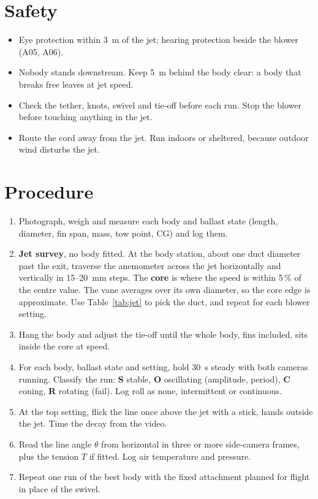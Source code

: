 \documentclass[final]{dbfdoc}
\begin{document}
\section{Safety}
\begin{itemize}
\item Eye protection within 3~m of the jet; hearing protection beside the blower (A05, A06).
\item Nobody stands downstream. Keep 5~m behind the body clear: a body that breaks free leaves at jet speed.
\item Check the tether, knots, swivel and tie-off before each run. Stop the blower before touching anything in the jet.
\item Route the cord away from the jet. Run indoors or sheltered, because outdoor wind disturbs the jet.
\end{itemize}

\section{Procedure}
\begin{enumerate}
\item Photograph, weigh and measure each body and ballast state (length, diameter, fin span, mass, tow point, CG) and log them.
\item \textbf{Jet survey}, no body fitted. At the body station, about one duct diameter past the exit, traverse the anemometer across the jet horizontally and vertically in 15--20~mm steps. The \textbf{core} is where the speed is within 5\,\% of the centre value. The vane averages over its own diameter, so the core edge is approximate. Use Table~\ref{tab:jet} to pick the duct, and repeat for each blower setting.
\item Hang the body and adjust the tie-off until the whole body, fins included, sits inside the core at speed.
\item For each body, ballast state and setting, hold 30~s steady with both cameras running. Classify the run: \textbf{S} stable, \textbf{O} oscillating (amplitude, period), \textbf{C} coning, \textbf{R} rotating (fail). Log roll as none, intermittent or continuous.
\item At the top setting, flick the line once above the jet with a stick, hands outside the jet. Time the decay from the video.
\item Read the line angle $\theta$ from horizontal in three or more side-camera frames, plus the tension $T$ if fitted. Log air temperature and pressure.
\item Repeat one run of the best body with the fixed attachment planned for flight in place of the swivel.
\end{enumerate}
\end{document}
